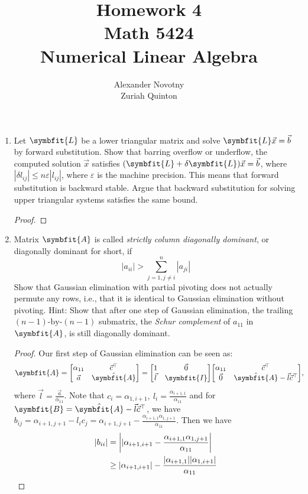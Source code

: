 \documentclass{article}
\title{Homework 4\\{\large Math 5424}\\{\large Numerical Linear Algebra}}
\author{Alexander Novotny\\Zuriah Quinton}
\theoremstyle{definition}
\newcommand{\mat}[1]{\symbfit{#1}}
\begin{document}
\maketitle

\begin{enumerate}[leftmargin=\labelsep]
	\item Let \(\mat{L}\) be a lower triangular matrix and solve \(\mat{L}\vec{x} = \vec{b}\) by forward substitution. Show that barring overflow or underflow, the computed solution \(\vec{x}\) satisfies \((\mat{L} + \delta\mat{L})\vec{x} = \vec{b}\), where \(|\delta l_{ij}| \leq n\varepsilon|l_{ij}|\), where \(\varepsilon\) is the machine precision. This means that forward substitution is backward stable. Argue that backward substitution for solving upper triangular systems satisfies the same bound.
	      \begin{proof}

	      \end{proof}

	\item Matrix \(\mat{A}\) is called \emph{strictly column diagonally dominant}, or diagonally dominant for short, if
	      \[
		      |a_{ii}| > \sum_{j=1, j \neq i}^{n} |a_{ji}|
	      \]
	      Show that Gaussian elimination with partial pivoting does not actually permute any rows, i.e., that it is identical to Gaussian elimination without pivoting. Hint: Show that after one step of Gaussian elimination, the trailing \((n - 1)\text{-by-}(n - 1)\) submatrix, the \emph{Schur complement} of \(a_{11}\) in \(\mat{A}\), is still diagonally dominant.
	      \begin{proof}
		      Our first step of Gaussian elimination can be seen as:
		      \begin{align*}
			      \mat{A} & = \mqty[\alpha_{11} & \vec{c}^\top \\ \vec{a} & \hat{\mat{A}}] = \mqty[1 & \vec{0} \\ \vec{l} & \mat{I}] \mqty[\alpha_{11} & \vec{c}^\top \\ \vec{0} & \hat{\mat{A}} - \vec{l}\vec{c}^\top],
		      \end{align*}
		      where \(\vec{l} = \frac{\vec{a}}{\alpha_{11}}\). Note that \(c_i = \alpha_{1,i + 1},\ l_i = \frac{\alpha_{i + 1, 1}}{\alpha_{11}}\) and for \(\mat{B} = \hat{\mat{A}} - \vec{l}\vec{c}^\top\), we have \(b_{ij} = \alpha_{i + 1, j + 1} - l_i c_j = \alpha_{i + 1, j + 1} - \frac{\alpha_{i + 1, 1} \alpha_{1,j + 1}}{\alpha_{11}}\). Then we have
		      \begin{align*}
			      |b_{ii}| & = \vqty{|\alpha_{i + 1, i + 1} - \frac{\alpha_{i + 1, 1} \alpha_{1,j + 1}}{\alpha_{11}}}  \\
			               & \geq |\alpha_{i + 1, i + 1}| - \frac{|\alpha_{i + 1, 1}| |\alpha_{1,i + 1}|}{\alpha_{11}} \\
		      \end{align*}
	      \end{proof}


\end{enumerate}
\end{document}
